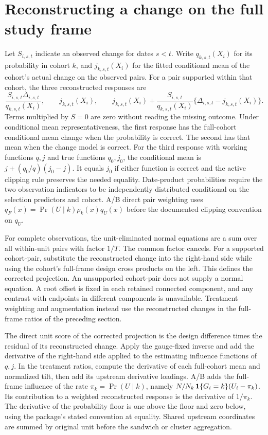 \documentclass[11pt]{article}
\begin{document}
\section*{Reconstructing a change on the full study frame}
Let \(S_{i,s,t}\) indicate an observed change for dates \(s<t\).
Write \(q_{k,s,t}(X_i)\) for its probability in cohort \(k\),
and \(j_{k,s,t}(X_i)\) for the fitted conditional mean of the cohort's
actual change on the observed pairs. For a pair supported within that cohort,
the three reconstructed responses are
\[
 \frac{S_{i,s,t}\Delta_{i,s,t}}{q_{k,s,t}(X_i)},\qquad
 j_{k,s,t}(X_i),\qquad
 j_{k,s,t}(X_i) + \frac{S_{i,s,t}}{q_{k,s,t}(X_i)}
   \{\Delta_{i,s,t}-j_{k,s,t}(X_i)\}.
\]
Terms multiplied by \(S=0\) are zero without reading the missing outcome.
Under conditional mean representativeness, the first response has the
full-cohort conditional mean change when the probability is correct. The
second has that mean when the change model is correct. For the third response
with working functions \(q,j\) and true functions \(q_0,j_0\), the conditional
mean is \(j+(q_0/q)(j_0-j)\). It equals \(j_0\) if either function is correct
and the active clipping rule preserves the needed equality. Date-product
probabilities require the two observation indicators to be independently
distributed conditional on the selection predictors and cohort. A/B direct
pair weighting uses \(q_F(x)=\Pr(U\mid k)\rho_k(x)q_U(x)\) before the
documented clipping convention on \(q_U\).

For complete observations, the unit-eliminated normal equations are a
sum over all within-unit pairs with factor \(1/T\). The common factor
cancels. For a supported cohort-pair, substitute the reconstructed
change into the right-hand side while using the cohort's full-frame design
cross products on the left. This defines the corrected projection.
An unsupported cohort-pair does not supply a normal equation. A root offset
is fixed in each retained connected component, and any contrast with endpoints
in different components is unavailable. Treatment weighting and augmentation
instead use the reconstructed changes in the full-frame ratios of the
preceding section.

The direct unit score of the corrected projection is the design difference
times the residual of its reconstructed change. Apply the gauge-fixed
inverse and add the derivative of the right-hand side applied to the
estimating influence functions of \(q,j\). In the treatment ratios, compute
the derivative of each full-cohort mean and normalized tilt, then add its
upstream derivative loadings. A/B adds the full-frame influence of the
rate \(\pi_k=\Pr(U\mid k)\), namely
\(N/N_k\,{\bf 1}\{G_i=k\}(U_i-\pi_k)\). Its contribution to a weighted
reconstructed response is the derivative of \(1/\pi_k\). The derivative
of the probability floor is one above the floor and zero below, using
the package's stated convention at equality. Shared upstream coordinates
are summed by original unit before the sandwich or cluster aggregation.
\end{document}
